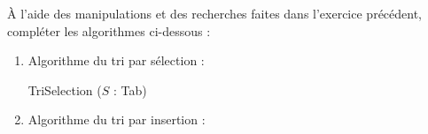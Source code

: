 \documentclass[a4paper,french]{article}
\newcounter{exonum}
\newcommand{\Exo}{\addtocounter{exonum}{1}{{\large \textbf {Exercice \theexonum .}}}}
\begin{document}
\Exo

À l'aide des manipulations et des recherches faites dans l'exercice précédent, compléter les algorithmes ci-dessous :

\begin{enumerate}
\item Algorithme du tri par sélection : 

\begin{algorithm}[H]
\DontPrintSemicolon
TriSelection ($S$ : Tab)\;
\BlankLine
\DontPrintSemicolon
{}
\PrintSemicolon
\BlankLine
\Deb{
\BlankLine
\BlankLine
\BlankLine
\BlankLine
\BlankLine
\BlankLine
\BlankLine
\BlankLine
\BlankLine
\BlankLine
\BlankLine
\BlankLine
\BlankLine
\BlankLine
\BlankLine
\BlankLine
\BlankLine
\BlankLine
\BlankLine
\BlankLine
\BlankLine
\BlankLine
\BlankLine
\BlankLine
\BlankLine
\BlankLine
\BlankLine
\BlankLine
\BlankLine
\BlankLine
\BlankLine
\BlankLine
\BlankLine
\BlankLine
\BlankLine
\BlankLine
\BlankLine
\BlankLine
\BlankLine
\BlankLine
\BlankLine
\BlankLine
\BlankLine
\BlankLine
\BlankLine
\BlankLine
\BlankLine
\BlankLine
\BlankLine
\BlankLine
\BlankLine
\BlankLine
\BlankLine
\BlankLine
\BlankLine
\BlankLine
\BlankLine
\BlankLine
\BlankLine
\BlankLine
\BlankLine
\BlankLine
\BlankLine
\BlankLine
\BlankLine
\BlankLine
\BlankLine
\BlankLine
\BlankLine
\BlankLine
\BlankLine
\BlankLine
\BlankLine
\BlankLine
\BlankLine
\BlankLine
\BlankLine
\BlankLine
\BlankLine
\BlankLine
\BlankLine
\BlankLine
\BlankLine
\BlankLine
\BlankLine
\BlankLine
\BlankLine
\BlankLine
\BlankLine
}
\end{algorithm}

\item Algorithme du tri par insertion : 


\end{enumerate}
\end{document}
